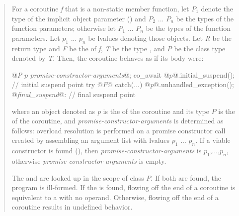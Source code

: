 \begin{quote}
\pnum
For a coroutine \textit{f} that is a non-static member function, let $P_1$ denote the type of the implicit object parameter () and $P_2$ ... $P_n$ be the types of the function parameters; otherwise let $P_1$ ... $P_n$ be the types of the function parameters. Let $p_1$ ... $p_n$ be lvalues denoting those objects.
Let \textit{R} be the return type and \textit{F} be the 
of \textit{f}, \textit{T} be the type , and \textit{P} be the class type denoted by \textit{T}. 
Then, the coroutine behaves as if its body were:
\begin{codeblock}
  {
     @\textit{P }$p$ \textit{promise-constructor-arguments}@;
     co_await @$p$@.initial_suspend(); // initial suspend point
     try { @\textit{F}@ } catch(...) { @\textit{p}@.unhandled_exception(); }
  @\textit{final_suspend}@:
     // final suspend point
  }
\end{codeblock}
where an object denoted as \textit{p} is the  of
the coroutine and its type $P$ is the 
of the coroutine,
and \textit{promise-constructor-arguments} is determined as follows:
overload resolution is performed on a promise constructor call created by
assembling an argument list with lvalues $p_1$ ... $p_n$. If a viable
constructor is found (), then
\textit{promise-constructor-arguments} is
\tcode{(}$p_1$,...,$p_n$\tcode{)}, otherwise
\textit{promise-constructor-arguments} is empty. 

\pnum
The 
 and  are looked up in the scope of class $P$. 
If both are found, the program is ill-formed. 
If the   is found, flowing off the end of a coroutine is equivalent to a  with no operand. Otherwise, flowing off the end of a coroutine results in undefined behavior.


\end{quote}
